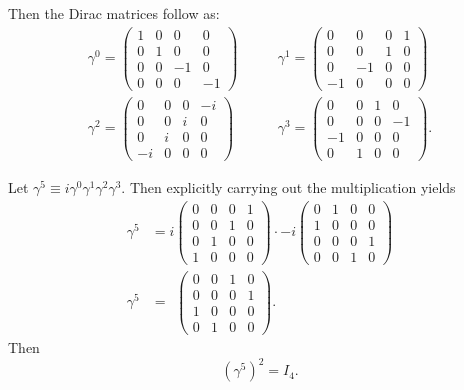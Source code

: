 Then the Dirac matrices follow as:
\begin{equation} \label{eqn:gammaExplicit}
\begin{split}
\gamma^0=
\begin{pmatrix}
1 & 0 & 0 & 0\\
0 & 1 & 0 & 0 \\
0 & 0 & -1 & 0 \\
0 & 0 & 0 & -1
\end{pmatrix}
& \qquad \gamma^1 =
\begin{pmatrix}
0 & 0 & 0 & 1\\
0 & 0 & 1 & 0 \\
0 & -1 & 0 & 0 \\
-1 & 0 & 0 & 0
\end{pmatrix}
\\
\gamma^2=
\begin{pmatrix}
0 & 0 & 0 & -i\\
0 & 0 & i & 0 \\
0 & i & 0 & 0 \\
-i & 0 & 0 & 0
\end{pmatrix}
& \qquad \gamma^3 =
\begin{pmatrix}
0 & 0 & 1 & 0\\
0 & 0 & 0 & -1 \\
-1 & 0 & 0 & 0 \\
0 & 1 & 0 & 0
\end{pmatrix}
.
\end{split}
\end{equation}
\label{apx:gammaMatrixProofs}

 \label{ssc:gamma52}

Let $\gamma^5\equiv i\gamma^0 \gamma^1 \gamma^2 \gamma^3$. Then explicitly
carrying out the
multiplication yields
\begin{align} \nonumber
\gamma^5&=i
\begin{pmatrix}
0 & 0 & 0 & 1\\
0 & 0 & 1 & 0\\
0 & 1 & 0 & 0\\
1 & 0 & 0 & 0
\end{pmatrix}
\cdot -i
\begin{pmatrix}
0 & 1 & 0 & 0\\
1 & 0 & 0 & 0\\
0 & 0 & 0 & 1\\
0 & 0 & 1 & 0
\end{pmatrix}
\\ \label{eqn:gamma5}
\gamma^5 &= \ \,
\begin{pmatrix}
0 & 0 & 1 & 0\\
0 & 0 & 0 & 1\\
1 & 0 & 0 & 0 \\
0 & 1 & 0 & 0
\end{pmatrix}.
\end{align}
Then
\begin{equation}\label{eqn:gamma52}
(\gamma^5)^2=I_4.
\end{equation}

